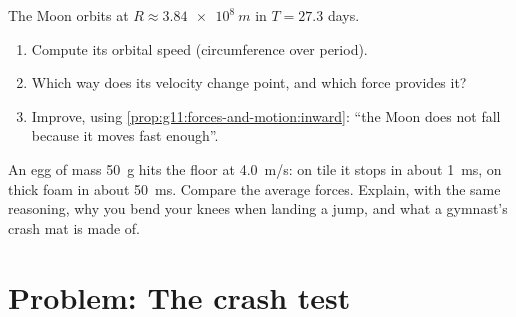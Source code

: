 \begin{exercise}[$\star\star\star$]\label{exo:g11:forces-and-motion:14}
The Moon orbits at $R \approx \qty{3.84e8}{m}$ in $T = \num{27.3}$ days.
\begin{enumerate}
  \item Compute its orbital speed (circumference over period).
  \item Which way does its velocity change point, and which force
        provides it?
  \item Improve, using \cref{prop:g11:forces-and-motion:inward}: ``the
        Moon does not fall because it moves fast enough''.
\end{enumerate}
\end{exercise}

\begin{exercise}[$\star\star\star$]\label{exo:g11:forces-and-motion:15}
An egg of mass \qty{50}{g} hits the floor at \qty{4.0}{m/s}: on tile it
stops in about \qty{1}{ms}, on thick foam in about \qty{50}{ms}. Compare
the average forces. Explain, with the same reasoning, why you bend your
knees when landing a jump, and what a gymnast's crash mat is made of.
\end{exercise}

\section{Problem: The crash test}

